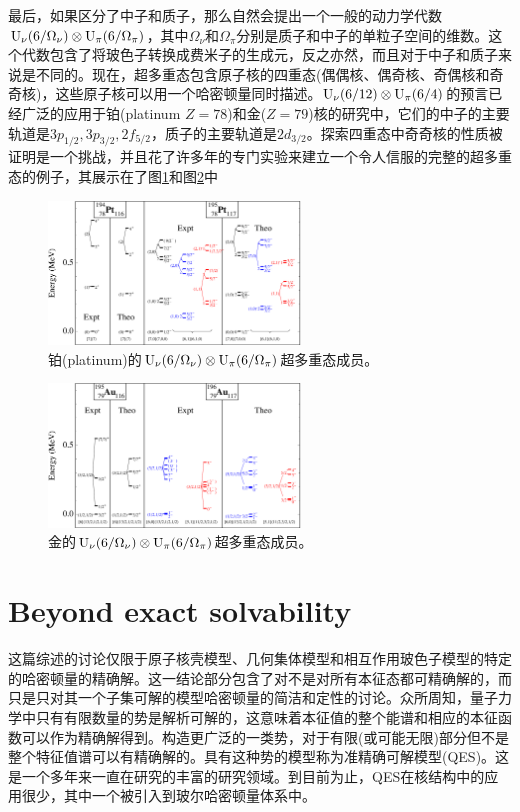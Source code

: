 最后，如果区分了中子和质子，那么自然会提出一个一般的动力学代数${\rm U}_\nu(6/\Omega_\nu)\otimes{\rm U}_\pi(6/\Omega_\pi)$，其中$\Omega_\nu$和$\Omega_\pi$分别是质子和中子的单粒子空间的维数。这个代数包含了将玻色子转换成费米子的生成元，反之亦然，而且对于中子和质子来说是不同的。现在，超多重态包含原子核的四重态(偶偶核、偶奇核、奇偶核和奇奇核)，这些原子核可以用一个哈密顿量同时描述。${\rm U}_\nu(6/12)\otimes{\rm U}_\pi(6/4)$的预言已经广泛的应用于铂(platinum $Z=78$)和金($Z=79$)核的研究中，它们的中子的主要轨道是$3p_{1/2},3p_{3/2},2f_{5/2}$，质子的主要轨道是$2d_{3/2}$。探索四重态中奇奇核的性质被证明是一个挑战，并且花了许多年的专门实验来建立一个令人信服的完整的超多重态的例子，其展示在了图\ref{F_quartet_pt}和图\ref{F_quartet_au}中
\begin{figure}[H]
\centering
\includegraphics[width=0.6\textwidth]{figure/F_quartet_pt.png}
\caption{铂(platinum)的${\rm U}_\nu(6/\Omega_\nu)\otimes{\rm U}_\pi(6/\Omega_\pi)$超多重态成员。\label{F_quartet_pt}}
\end{figure}
\begin{figure}[H]
\centering
\includegraphics[width=0.6\textwidth]{figure/F_quartet_au.png}
\caption{金的${\rm U}_\nu(6/\Omega_\nu)\otimes{\rm U}_\pi(6/\Omega_\pi)$超多重态成员。\label{F_quartet_au}}
\end{figure}

\section{Beyond exact solvability}

这篇综述的讨论仅限于原子核壳模型、几何集体模型和相互作用玻色子模型的特定的哈密顿量的精确解。这一结论部分包含了对不是对所有本征态都可精确解的，而只是只对其一个子集可解的模型哈密顿量的简洁和定性的讨论。众所周知，量子力学中只有有限数量的势是解析可解的，这意味着本征值的整个能谱和相应的本征函数可以作为精确解得到。构造更广泛的一类势，对于有限(或可能无限)部分但不是整个特征值谱可以有精确解的。具有这种势的模型称为准精确可解模型(QES)。这是一个多年来一直在研究的丰富的研究领域。到目前为止，QES在核结构中的应用很少，其中一个被引入到玻尔哈密顿量体系中。

